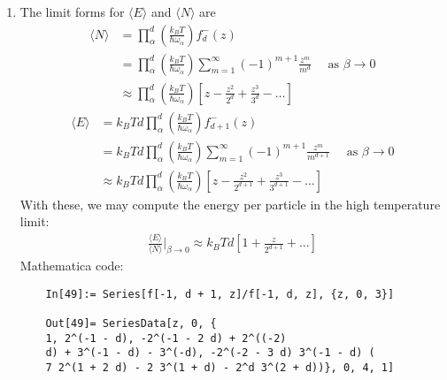 \documentclass{article}
\theoremstyle{definition}
\newcommand{\al}{\alpha}
\newcommand{\be}{\beta}
\newcommand{\f}[2]{\frac{#1}{#2}}
\newcommand{\lp}{\left(}
\newcommand{\rp}{\right)}
\newcommand{\lb}{\left[}
\newcommand{\rb}{\right]}
\begin{document}
\begin{enumerate}[label=(\alph*)]
	
	
	
	\item The limit forms for $\langle E\rangle$ and $\langle N\rangle$ are
	\begin{align*}
	\langle N \rangle 
	&=\prod_\al^d \lp \f{k_BT}{\hbar \omega_\al} \rp f^-_d(z) \\
	&= \prod_\al^d \lp \f{k_BT}{\hbar \omega_\al}\rp     \sum_{m=1}^\infty (-1)^{m+1}\f{z^m}{m^d}\quad\text{ as } \be \to 0\\
	&\approx \prod_\al^d \lp \f{k_BT}{\hbar \omega_\al}\rp \lb z -\f{z^2}{2^d} + \f{z^3}{3^d} - \dots  \rb
	\end{align*}
	\begin{align*}
	\langle E\rangle 
	&=  k_B T d  \prod_\al^d \lp \f{k_BT}{\hbar \omega_\al}\rp f^-_{d+1}(z) \\
	&=  k_B T d  \prod_\al^d \lp \f{k_BT}{\hbar \omega_\al}\rp \sum_{m=1}^\infty (-1)^{m+1}\f{z^m}{m^{d+1}}\quad\text{ as } \be \to 0\\
	&\approx  k_B T d  \prod_\al^d \lp \f{k_BT}{\hbar \omega_\al}\rp  \lb z -\f{z^2}{2^{d+1}} + \f{z^3}{3^{d+1}} - \dots  \rb
	\end{align*}
	With these, we may compute the energy per particle in the high temperature limit:
	\begin{align*}
	\boxed{\f{\langle E\rangle}{\langle N\rangle}\bigg\vert_{\be \to 0} \approx k_B T d \lb 1 + \f{z}{2^{d+1}} + \dots \rb}
	\end{align*}
	Mathematica code:
	\begin{lstlisting}
	In[49]:= Series[f[-1, d + 1, z]/f[-1, d, z], {z, 0, 3}]
	
	Out[49]= SeriesData[z, 0, {
	1, 2^(-1 - d), -2^(-1 - 2 d) + 2^((-2)
	d) + 3^(-1 - d) - 3^(-d), -2^(-2 - 3 d) 3^(-1 - d) (
	7 2^(1 + 2 d) - 2 3^(1 + d) - 2^d 3^(2 + d))}, 0, 4, 1]
	\end{lstlisting}
	

\end{enumerate}
\end{document}
